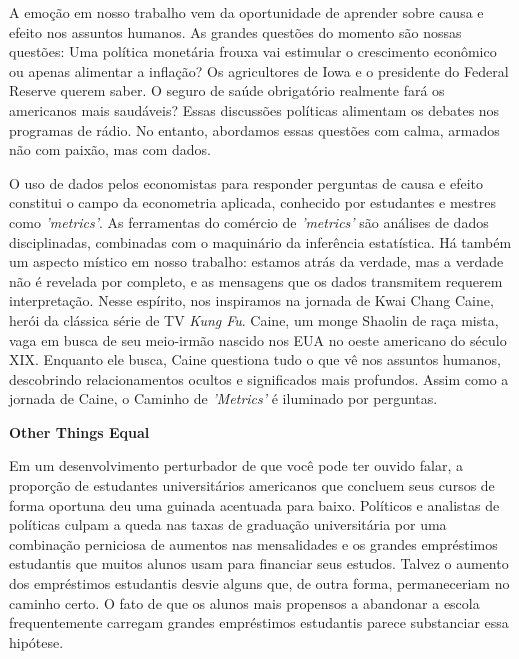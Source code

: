 \documentclass[a4paper,12pt]{article}[abntex2]
\begin{document}
A emoção em nosso trabalho vem da oportunidade de aprender sobre causa e efeito nos assuntos humanos. As grandes questões do momento são nossas questões: Uma política monetária frouxa vai estimular o crescimento econômico ou apenas alimentar a inflação? Os agricultores de Iowa e o presidente do Federal Reserve querem saber. O seguro de saúde obrigatório realmente fará os americanos mais saudáveis? Essas discussões políticas alimentam os debates nos programas de rádio. No entanto, abordamos essas questões com calma, armados não com paixão, mas com dados.

O uso de dados pelos economistas para responder perguntas de causa e efeito constitui o campo da econometria aplicada, conhecido por estudantes e mestres como \emph{'metrics'}. As ferramentas do comércio de \emph{'metrics'} são análises de dados disciplinadas, combinadas com o maquinário da inferência estatística. Há também um aspecto místico em nosso trabalho: estamos atrás da verdade, mas a verdade não é revelada por completo, e as mensagens que os dados transmitem requerem interpretação. Nesse espírito, nos inspiramos na jornada de Kwai Chang Caine, herói da clássica série de TV \emph{Kung Fu}. Caine, um monge Shaolin de raça mista, vaga em busca de seu meio-irmão nascido nos EUA no oeste americano do século XIX. Enquanto ele busca, Caine questiona tudo o que vê nos assuntos humanos, descobrindo relacionamentos ocultos e significados mais profundos. Assim como a jornada de Caine, o Caminho de \emph{'Metrics'} é iluminado por perguntas.

\textbf{Other Things Equal}

Em um desenvolvimento perturbador de que você pode ter ouvido falar, a proporção de estudantes universitários americanos que concluem seus cursos de forma oportuna deu uma guinada acentuada para baixo. Políticos e analistas de políticas culpam a queda nas taxas de graduação universitária por uma combinação perniciosa de aumentos nas mensalidades e os grandes empréstimos estudantis que muitos alunos usam para financiar seus estudos. Talvez o aumento dos empréstimos estudantis desvie alguns que, de outra forma, permaneceriam no caminho certo. O fato de que os alunos mais propensos a abandonar a escola frequentemente carregam grandes empréstimos estudantis parece substanciar essa hipótese.
\end{document}
